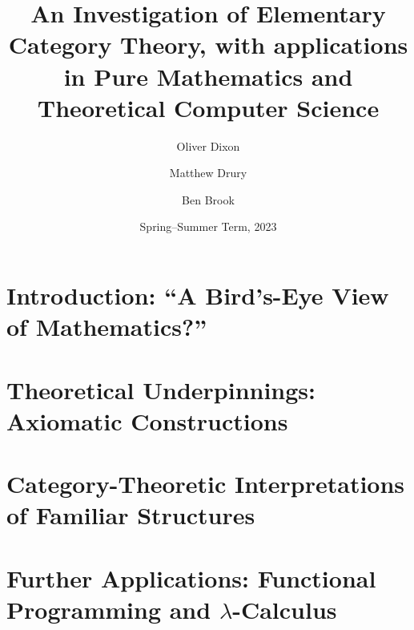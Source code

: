 \documentclass[10pt]{amsart}
\title[An Investigation of Elementary Category Theory]{An Investigation of %
        Elementary Category Theory, with applications in Pure Mathematics and %
        Theoretical Computer Science}
\author{Oliver Dixon}  \email{\yorkemail{od641}}
\author{Matthew Drury} \email{\yorkemail{md1499}}
\author{Ben Brook}     \email{\yorkemail{bb1170}}
\date{Spring--Summer Term, 2023}
\begin{document}
%
\begin{abstract}
        \lipsum[1-1]
\end{abstract}
\maketitle
\tableofcontents
\section{Introduction: ``A Bird's-Eye View of Mathematics?''}
\lipsum[2-8]
\section{Theoretical %
        Underpinnings: Axiomatic Constructions}
\lipsum[9-28]
\section{Category-Theoretic %
        Interpretations of Familiar Structures}
\lipsum[29-48]
\section{Further Applications: %
        Functional Programming and \texorpdfstring{$\lambda$}{Lambda}-Calculus}
\lipsum[49-68]
\printbibliography[title=Cited Works and Further Reading]
%
\end{document}

